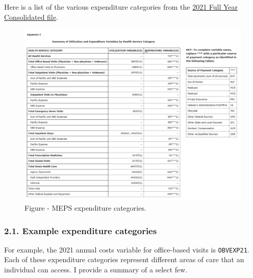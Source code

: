 \documentclass[
]{book}
\begin{document}
Here is a list of the various expenditure categories from the \href{https://meps.ahrq.gov/data_stats/download_data/pufs/h233/h233doc.shtml}{2021 Full Year Consolidated file}.

\begin{figure}
\includegraphics[width=1\linewidth]{Figure 7_1 - MEPS - Appendix 3} \caption{Figure - MEPS expenditure categories.}\label{fig:unnamed-chunk-98}
\end{figure}

\hypertarget{example-expenditure-categories}{%
\subsubsection{2.1. Example expenditure categories}\label{example-expenditure-categories}}

For example, the 2021 annual costs variable for office-based visits is \texttt{OBVEXP21}. Each of these expenditure categories represent different areas of care that an individual can access. I provide a summary of a select few.
\end{document}
